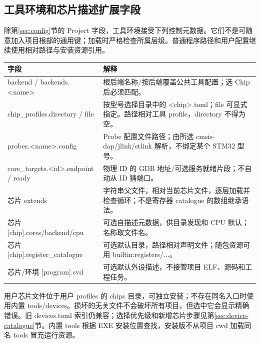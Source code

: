 \documentclass[UTF8,a4paper,11pt,oneside,fontset=none]{ctexart}
\begin{document}
\subsection{工具环境和芯片描述扩展字段}
\label{sec:chip-schema-complete}
除第\ref{sec:config}节的 Project 字段，工具环境接受下列控制元数据。它们不是可随意加入项目根部的通用键；加载时严格检查所属层级。普通程序路径和用户配置继续使用相对路径与安装资源引用。
\begin{longtable}{@{}P{54mm}P{107mm}@{}}\toprule
字段 & 解释\\\midrule\endhead
backend / backends.<name> & 根后端名称/按后端覆盖公共工具配置；选 Chip 后必须匹配。\\
chip\_profiles.directory / file & 按型号选择目录中的 <chip>.toml；file 可显式指定。路径相对工具 profile，directory 不得为空。\\
probes.<name>.config & Probe 配置文件路径；由所选 cmsis-dap/jlink/stlink 解析，不绑定某个 STM32 型号。\\
core\_targets.<id>.endpoint / ready & 物理 ID 的 GDB 地址/可选服务就绪片段；不自动从 ID 猜端口。\\
芯片 extends & 字符串父文件，相对当前芯片文件，逐层加载并检查循环；不是寄存器 catalogue 的数组继承语法。\\
芯片 [chip].cores/backend/cpu & 可选自描述元数据，供目录发现和 CPU 默认；名称取文件名。\\
芯片 [chip].register\_catalogue & 可选默认目录，路径相对声明文件；随包资源可用 builtin:registers/...。\\
芯片/环境 [program].svd & 可选默认外设描述，不接管项目 ELF、源码和工程任务。\\\bottomrule
\end{longtable}
用户芯片文件位于用户 profiles 的 chips 目录，可独立安装；不存在同名入口时使用内置 tools/devices。损坏的无关文件不会破坏所有项目，但选中它会显示精确错误。旧 devices.toml 索引仍兼容；选择优先级和新增芯片步骤见第\ref{sec:device-catalogue}节。内置 tools 根据 EXE 安装位置查找，安装版不从项目 cwd 加载同名 tools 冒充运行资源。

\end{document}
